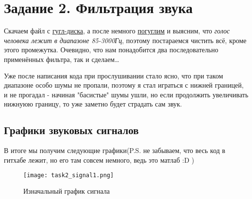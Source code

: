 \chapter{Задание 2. Фильтрация звука}
\label{ch:chap3}



\lstset{style=mystyle}

Скачаем файл с \href{https://drive.google.com/drive/folders/1o8ozGv-bwYWuNpUlfYqM3rDu85QSQ0JW}{гугл-диска}, а после немного \href{https://habr.com/ru/companies/intel/articles/558224/}{погуглим} и выясним, что \textit{голос человека лежит в диапазоне 85-3000Гц}, поэтому постараемся чистить всё, кроме этого промежутка.
Очевидно, что нам понадобится два последовательно применённых фильтра, так и сделаем\dots

Уже после написания кода при прослушивании стало ясно, что при таком диапазоне особо шумы не пропали, поэтому я стал играться с нижней границей, и не прогадал - начиная "басистые" шумы ушли, но если продолжить увеличивать нижнуюю границу, то уже заметно будет страдать сам звук.


\section{Графики звуковых сигналов}

В итоге мы получим следующие графики(P.S. не забываем, что весь код в гитхабе лежит, но его там совсем немного, ведь это матлаб :D )

\begin{figure}[ht]
    \centering
    \texttt{[image: task2\_signal1.png]}
    \caption{Изначальный график сигнала}
\end{figure}

